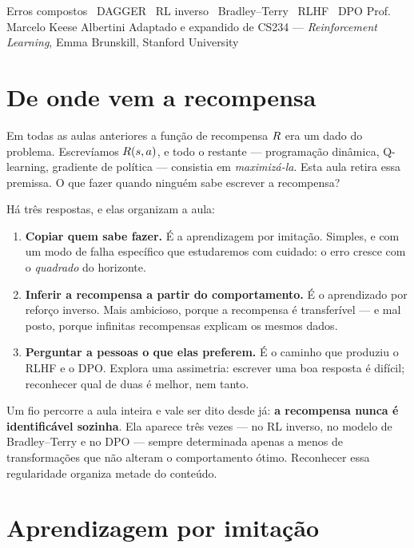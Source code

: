 \documentclass[11pt, a4paper]{article}
\begin{document}
     {Erros compostos \textbullet\ DAGGER \textbullet\ RL inverso \textbullet\ Bradley--Terry \textbullet\ RLHF \textbullet\ DPO}
     {Prof. Marcelo Keese Albertini}
     {Adaptado e expandido de CS234 --- \emph{Reinforcement Learning}, Emma Brunskill, Stanford University}

\section{De onde vem a recompensa}

Em todas as aulas anteriores a função de recompensa $R$ era um dado do
problema. Escrevíamos $R(s,a)$, e todo o restante --- programação dinâmica,
Q-learning, gradiente de política --- consistia em \emph{maximizá-la}. Esta aula
retira essa premissa. O que fazer quando ninguém sabe escrever a recompensa?

Há três respostas, e elas organizam a aula:

\begin{enumerate}
  \item \textbf{Copiar quem sabe fazer.} É a aprendizagem por imitação. Simples,
    e com um modo de falha específico que estudaremos com cuidado: o erro cresce
    com o \emph{quadrado} do horizonte.
  \item \textbf{Inferir a recompensa a partir do comportamento.} É o
    aprendizado por reforço inverso. Mais ambicioso, porque a recompensa é
    transferível --- e mal posto, porque infinitas recompensas explicam os
    mesmos dados.
  \item \textbf{Perguntar a pessoas o que elas preferem.} É o caminho que
    produziu o RLHF e o DPO. Explora uma assimetria: escrever uma boa resposta é
    difícil; reconhecer qual de duas é melhor, nem tanto.
\end{enumerate}

\begin{ideiabox}
Um fio percorre a aula inteira e vale ser dito desde já: \textbf{a recompensa
nunca é identificável sozinha}. Ela aparece três vezes --- no RL inverso, no
modelo de Bradley--Terry e no DPO --- sempre determinada apenas a menos de
transformações que não alteram o comportamento ótimo. Reconhecer essa
regularidade organiza metade do conteúdo.
\end{ideiabox}

\section{Aprendizagem por imitação}
\end{document}
